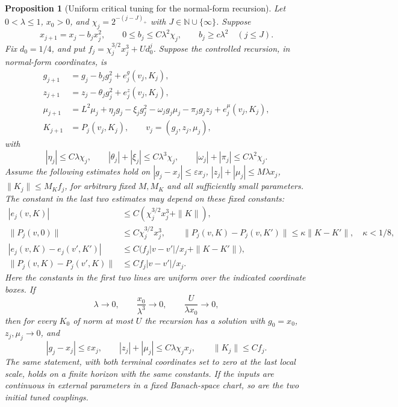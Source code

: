 \documentclass[11pt]{article}
\newtheorem{proposition}{Proposition}[section]
\begin{document}
\begin{proposition}[Uniform critical tuning for the normal-form recursion]\label{prop:scaled_flow}
Let \(0<\lambda\le1\), \(x_0>0\), and \(\chi_j=2^{-(j-J)_+}\) with
\(J\in\mathbb N\cup\{\infty\}\). Suppose
\[
 x_{j+1}=x_j-b_jx_j^2,\qquad
 0\le b_j\le C\lambda^2\chi_j,\qquad
 b_j\ge c\lambda^2\quad(j\le J).
\]
Fix \(d_0=1/4\), and put
\(f_j=\chi_j^{3/2}x_j^3+U d_0^j\).
Suppose the controlled recursion, in normal-form coordinates, is
\begin{align*}
 g_{j+1}&=g_j-b_jg_j^2+e_j^g(v_j,K_j),\\
 z_{j+1}&=z_j-\theta_jg_j^2+e_j^z(v_j,K_j),\\
 \mu_{j+1}&=L^2\mu_j+\eta_jg_j-\xi_jg_j^2
       -\omega_jg_j\mu_j-\pi_jg_jz_j+e_j^\mu(v_j,K_j),\\
 K_{j+1}&=P_j(v_j,K_j),\qquad v_j=(g_j,z_j,\mu_j),
\end{align*}
with
\[
 |\eta_j|\le C\lambda\chi_j,\qquad
 |\theta_j|+|\xi_j|\le C\lambda^3\chi_j,\qquad
 |\omega_j|+|\pi_j|\le C\lambda^2\chi_j.
\]
Assume the following estimates hold on
\(|g_j-x_j|\le\varepsilon x_j\),
\(|z_j|+|\mu_j|\le M\lambda x_j\),
\(\|K_j\|\le M_K f_j\), for arbitrary fixed \(M,M_K\) and all
sufficiently small parameters. The constant in the last two estimates
may depend on these fixed constants:
\begin{align*}
 |e_j(v,K)|&\le C(\chi_j^{3/2}x_j^3+\|K\|),\\
 \|P_j(v,0)\|&\le C\chi_j^{3/2}x_j^3,\qquad
 \|P_j(v,K)-P_j(v,K')\|\le\kappa\|K-K'\|,\quad\kappa<1/8,\\
 |e_j(v,K)-e_j(v',K')|&\le C\big(f_j|v-v'|/x_j+\|K-K'\|\big),\\
 \|P_j(v,K)-P_j(v',K)\|&\le C f_j|v-v'|/x_j .
\end{align*}
Here the constants in the first two lines are uniform over the
indicated coordinate boxes. If
\[
 \lambda\longrightarrow0,\qquad
 \frac{x_0}{\lambda^3}\longrightarrow0,\qquad
 \frac{U}{\lambda x_0}\longrightarrow0,
\]
then for every \(K_0\) of norm at most \(U\) the recursion has a
solution with \(g_0=x_0\), \(z_j,\mu_j\to0\), and
\[
 |g_j-x_j|\le\varepsilon x_j,\qquad
 |z_j|+|\mu_j|\le C\lambda\chi_j x_j,\qquad
 \|K_j\|\le C f_j.
\]
The same statement, with both terminal coordinates set to zero at the
last local scale, holds on a finite horizon with the same constants.
If the inputs are continuous in external parameters in a fixed
Banach-space chart, so are the two initial tuned couplings.
\end{proposition}
\end{document}
